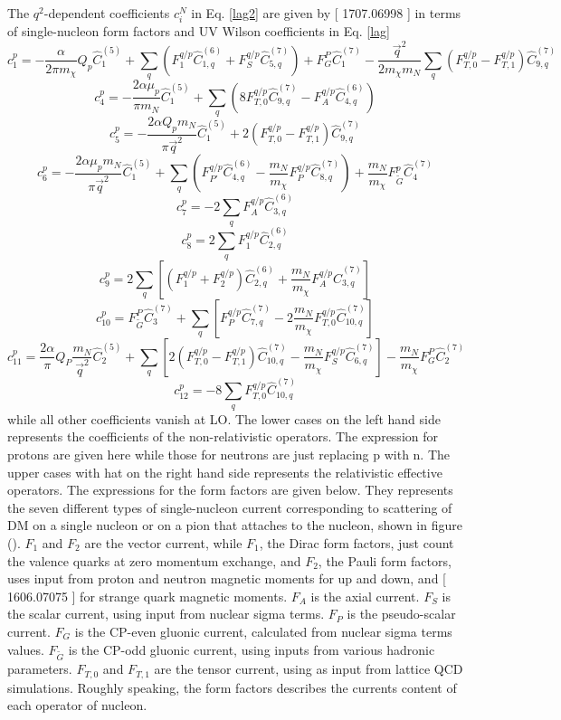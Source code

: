\documentclass[12pt]{article}
\begin{document}
The $q^2$-dependent coefficients $c_i^N$ in Eq. \ref{lag2} are given by [ 1707.06998 ] in terms of single-nucleon form factors and UV Wilson coefficients in Eq. \ref{lag}
$$
c_1^p = - \frac {\alpha} {2 \pi m_\chi } Q_p \hat C_1^{(5)} + \sum_q ( F_1^{q/p} \hat C_{1,q}^{(6)} + F_S^{q/p} \hat C_{5,q}^{(7)} ) + F_G^P \hat C_1^{(7)} - \frac { \vec q^2}{2 m_\chi m_N } \sum_q (F_{T,0}^{q/p} - F_{T,1}^{q/p} ) \hat C_{9,q}^{(7)}
$$
$$
c_4^p = - \frac {2\alpha \mu_p } { \pi m_N }  \hat C_1^{(5)} + \sum_q ( 8 F_{T,0}^{q/p} \hat C_{9,q}^{(7)} - F_A^{q/p} \hat C_{4,q}^{(6)} ) 
$$
$$
c_5^p = - \frac {2\alpha  Q_p m_N} { \pi \vec q^2 } \hat C_1^{(5)} + 2 (  F_{T,0}^{q/p} - F_{T,1}^{q/p} )\hat C_{9,q}^{(7)} 
$$
$$
c_6^p = - \frac {2\alpha \mu_p m_N } { \pi \vec q^2 }  \hat C_1^{(5)} + \sum_q (  F_{P'}^{q/p} \hat C_{4,q}^{(6)} - \frac{m_N}{m_\chi} F_P^{q/p} \hat C_{8,q}^{(7)} ) + \frac{m_N}{m_\chi} F_{\tilde G}^p \hat C_4^{(7)}
$$
$$
c_7^p = - 2 \sum    _q F_A^{q/p} \hat C_{3,q}^{(6)} 
$$
$$
c_8^p = 2 \sum_q F_1^{q/p} \hat C_{2,q}^{(6)} 
$$
$$
c_9^p = 2 \sum_q [ ( F_1^{q/p} + F_2^{q/p}  ) \hat C_{2,q}^{(6)}  +  \frac{m_N}{m_\chi} F_A^{q/p} \hat C^{(7)}_{3,q} ]
$$
$$
c_{10}^p = F_{\tilde G}^P \hat C_3^{(7)} +  \sum_q [ F_P ^{q/p} \hat C_{7,q}^{(7)}  - 2 \frac{m_N}{m_\chi} F_{T,0}^{q/p} \hat C_{10,q}^{(7)} ]
$$
$$
c_{11}^p = \frac{2\alpha}{\pi} Q_P \frac{m_N}{\vec q ^2 } \hat C_2^{(5)} + \sum_q [ 2 (F_{T,0}^{q/p} - F_{T,1}^{q/p} ) \hat C_{10,q}^{(7)} -\frac{m_N}{m_\chi} F_S^{q/p} \hat C_{6,q}^{(7)} ] - \frac{m_N}{m_\chi} F_G^P \hat C_2^{(7)}
$$
$$
c_{12}^p = -8 \sum_q F_{T,0}^{q/p} \hat C_{10,q}^{(7)}
$$
while all other coefficients vanish at LO. The lower cases on the left hand side represents the coefficients of the non-relativistic operators. The expression for protons are given here while those for neutrons are just replacing p with n. The upper cases with hat on the right hand side represents the relativistic effective operators. The expressions for the form factors are given below. They represents the seven different types of single-nucleon current corresponding to scattering of DM on a single nucleon or on a pion that attaches to the nucleon, shown in figure (). $F_1$ and $F_2$ are the vector current, while $F_1$, the Dirac form factors, just count the valence quarks at zero momentum exchange, and $F_2$, the Pauli form factors, uses input from proton and neutron magnetic moments for up and down, and [ 1606.07075 ] for strange quark magnetic moments. $F_A$ is the axial current. $F_S$ is the scalar current, using input from nuclear sigma terms. $F_P$ is the pseudo-scalar current. $F_G$ is the CP-even gluonic current, calculated from nuclear sigma terms values. $F_{\tilde G} $ is the CP-odd gluonic current, using inputs from various hadronic parameters. $F_{T,0}$ and $F_{T,1}$ are the tensor current, using as input from lattice QCD simulations. Roughly speaking, the form factors describes the currents content of each operator of nucleon. 
\end{document}
